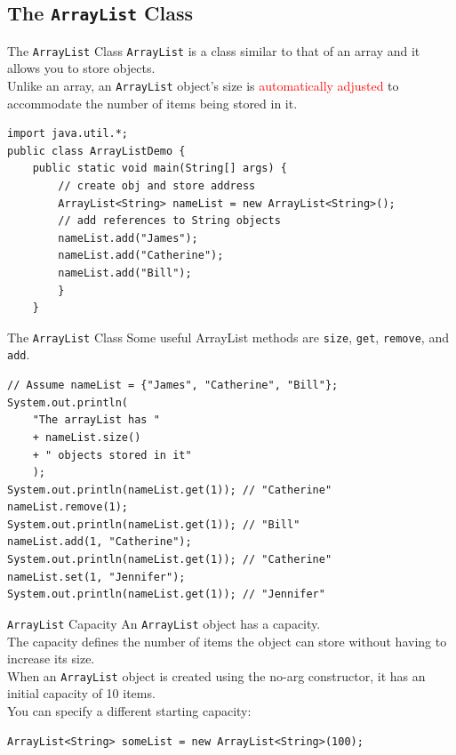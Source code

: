\documentclass[11pt]{beamer}
\newcommand{\red}[1]{\textcolor{red}{#1}}
\begin{document}
\subsection{The \texttt{ArrayList} Class}
\begin{frame}[fragile]
{The \texttt{ArrayList} Class}
    \texttt{ArrayList} is a class similar to that of an array and it allows you to store objects. \\ \vspace{1em}
    Unlike an array, an \texttt{ArrayList} object’s size is \red{automatically adjusted} to accommodate the number of items being stored in it. \\ \vspace{1em}
    \begin{lstlisting}[basicstyle=\ttfamily\footnotesize]
import java.util.*;
public class ArrayListDemo {
	public static void main(String[] args) {
		// create obj and store address
		ArrayList<String> nameList = new ArrayList<String>();
		// add references to String objects
		nameList.add("James");
		nameList.add("Catherine");
		nameList.add("Bill");
		}
	}
    \end{lstlisting}    
\end{frame}

\begin{frame}[fragile]
{The \texttt{ArrayList} Class}
    Some useful ArrayList methods are \texttt{size}, \texttt{get}, \texttt{remove}, and \texttt{add}.
    \begin{lstlisting}[basicstyle=\ttfamily\footnotesize]
// Assume nameList = {"James", "Catherine", "Bill"};
System.out.println(
    "The arrayList has "
    + nameList.size()
    + " objects stored in it"
    );
System.out.println(nameList.get(1)); // "Catherine"
nameList.remove(1);
System.out.println(nameList.get(1)); // "Bill"
nameList.add(1, "Catherine");
System.out.println(nameList.get(1)); // "Catherine"
nameList.set(1, "Jennifer");
System.out.println(nameList.get(1)); // "Jennifer"
    \end{lstlisting}
\end{frame}

\begin{frame}[fragile]
{\texttt{ArrayList} Capacity}
    An \texttt{ArrayList} object has a capacity. \\ \vspace{1em}
    The capacity defines the number of items the object can store without having to increase its size. \\ \vspace{1em}
    When an \texttt{ArrayList} object is created using the no-arg constructor, it has an initial capacity of 10 items. \\ \vspace{1em}
    You can specify a different starting capacity:
    \begin{lstlisting}
ArrayList<String> someList = new ArrayList<String>(100);
    \end{lstlisting}
    
\end{frame}
\end{document}
